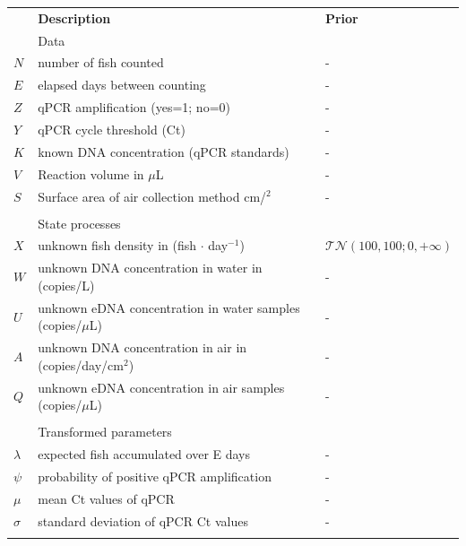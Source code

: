 \documentclass{article}
\begin{document}
\clearpage
\begin{table}
    \centering
    \begin{tabular}{lll}
         & \textbf{Description} & \textbf{Prior} \\
&Data & \\
\hline
$N$ & number of fish counted & - \\
$E$ & elapsed days between counting & - \\
$Z$ & qPCR amplification (yes=1; no=0) & - \\
$Y$ & qPCR cycle threshold (Ct) & - \\
$K$ & known DNA concentration (qPCR standards) & - \\
$V$ & Reaction volume in $\mu$L & - \\
$S$ & Surface area of air collection method cm/$^2$ & - \\

&&\\
&State processes&\\
\hline
$X$ & unknown fish density in (fish $\cdot$ day$^{-1}$) & $\mathcal{TN}(100,100;0,+\infty)$ \\
$W$ & unknown DNA concentration in water in (copies/L) & - \\
$U$&unknown eDNA concentration in water samples (copies/$\mu$L) & - \\
$A$ & unknown DNA concentration in air in (copies/day/cm$^2$) & - \\
$Q$ & unknown eDNA concentration in air samples (copies/$\mu$L) & - \\

&&\\

&Transformed parameters&\\
\hline
$\lambda$& expected fish accumulated over E days & - \\
$\psi$& probability of positive qPCR amplification & - \\
$\mu$& mean Ct values of qPCR & - \\
$\sigma$& standard deviation of qPCR Ct values & - \\
&&\\


\end{tabular}
\end{table}
\end{document}
